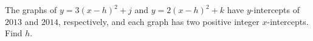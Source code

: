 The graphs of $y=3(x-h)^2+j$ and $y=2(x-h)^2+k$ have $y$-intercepts of $2013$ and $2014$,  respectively, and each graph has two positive integer $x$-intercepts. Find $h$.